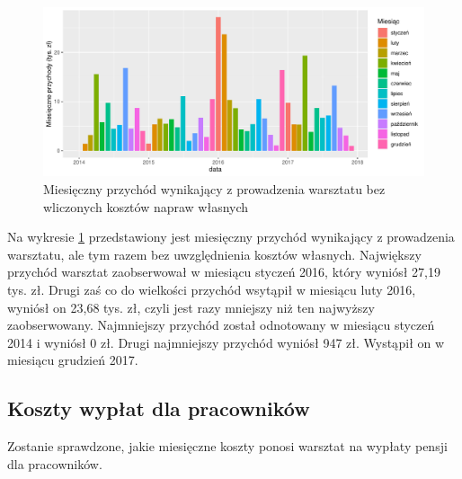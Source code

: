 \documentclass{article}\usepackage[]{graphicx}\usepackage[]{xcolor}
\makeatletter
\def\maxwidth{ %
  \ifdim\Gin@nat@width>\linewidth
    \linewidth
  \else
    \Gin@nat@width
  \fi
}
\newenvironment{knitrout}{}{} %
\makeatother
\begin{document}
\begin{knitrout}
\color{fgcolor}\begin{figure}[H]

{\centering \includegraphics[width=\maxwidth]{figure/fig_uslugi2-1} 

}

\caption[Miesięczny przychód wynikający z prowadzenia warsztatu bez wliczonych kosztów napraw własnych]{Miesięczny przychód wynikający z prowadzenia warsztatu bez wliczonych kosztów napraw własnych}\label{fig:fig_uslugi2}
\end{figure}

\end{knitrout}

Na wykresie \ref{fig:fig_uslugi2} przedstawiony jest miesięczny przychód wynikający z prowadzenia warsztatu, ale tym razem bez uwzględnienia kosztów własnych. 
Największy przychód warsztat zaobserwował w miesiącu styczeń 2016, który wyniósł 27,19 tys. zł.
Drugi zaś co do wielkości przychód wsytąpił w miesiącu luty 2016, wyniósł on 23,68 tys. zł, czyli jest  razy mniejszy niż ten najwyższy zaobserwowany.
Najmniejszy przychód został odnotowany w miesiącu styczeń 2014 i wyniósł 0 zł. 
Drugi najmniejszy przychód wyniósł 947 zł. Wystąpił on w miesiącu grudzień 2017.

\subsection{Koszty wypłat dla pracowników}

Zostanie sprawdzone, jakie miesięczne koszty ponosi warsztat na wypłaty pensji dla pracowników.

\end{document}

